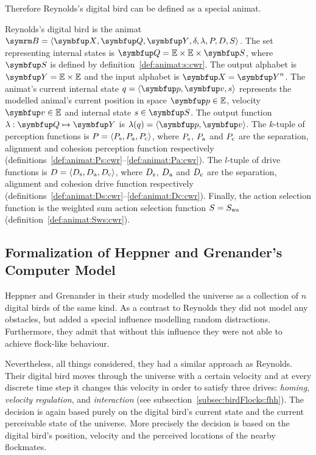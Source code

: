 Therefore Reynolds's digital bird can be defined as a special animat.

\begin{definition}
  \label{def:animat:cwr}
  Reynolds's digital bird is the animat $\autom{B}=\langle\set{X},\set{Q},\set{Y},\delta,\lambda,P,D,S\rangle$. The set representing internal states is $\set{Q}=\E \times \E \times \set{S}$, where $\set{S}$ is defined by definition~\ref{def:animat:s:cwr}. The output alphabet is $\set{Y}=\E \times \E$ and the input alphabet is $\set{X}=\set{Y}^n$. The animat's current internal state $q=\langle\vect{p},\vect{v},s\rangle$ represents the modelled animal's current position in space $\vect{p} \in \E$, velocity $\vect{v} \in \E$ and internal state $s \in \set{S}$. The output function $\lambda: \set{Q} \mapsto \set{Y}$ is $\lambda(q)=\langle\vect{p},\vect{v}\rangle$. The $k$-tuple of perception functions is $P=\langle P_\textnormal{s},P_\textnormal{a},P_\textnormal{c}\rangle$, where $P_\textnormal{s}$, $P_\textnormal{a}$ and $P_\textnormal{c}$ are the separation, alignment and cohesion perception function respectively (definitions~\ref{def:animat:Ps:cwr}--\ref{def:animat:Pa:cwr}). The $l$-tuple of drive functions is $D=\langle D_\textnormal{s},D_\textnormal{a},D_\textnormal{c}\rangle$, where $D_\textnormal{s}$, $D_\textnormal{a}$ and $D_\textnormal{c}$ are the separation, alignment and cohesion drive function respectively (definitions~\ref{def:animat:Ds:cwr}--\ref{def:animat:Dc:cwr}). Finally, the action selection function is the weighted sum action selection function $S=S_\textnormal{ws}$ (definition~\ref{def:animat:Sws:cwr}).
\end{definition}

\subsection{Formalization of Heppner and Grenander's Computer Model}
\label{subsec:animat:fhh}
Heppner and Grenander in their study \cite{heppner:1990} modelled the universe as a collection of $n$ digital birds of the same kind. As a contrast to Reynolds they did not model any obstacles, but added a special influence modelling random distractions. Furthermore, they admit that without this influence they were not able to achieve flock-like behaviour.

Nevertheless, all things considered, they had a similar approach as Reynolds. Their digital bird moves through the universe with a certain velocity and at every discrete time step it changes this velocity in order to satisfy three drives: \emph{homing}, \emph{velocity regulation}, and \emph{interaction} (see subsection~\ref{subsec:birdFlocks:fhh}). The decision is again based purely on the digital bird's current state and the current perceivable state of the universe. More precisely the decision is based on the digital bird's position, velocity and the perceived locations of the nearby flockmates.

